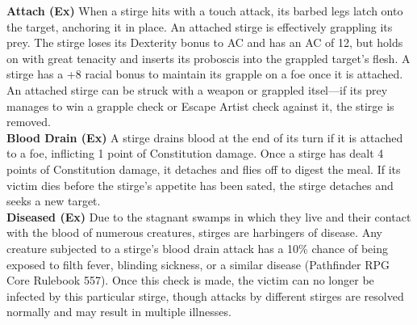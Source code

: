 \textbf{Attach (Ex)} When a stirge hits with a touch attack, its barbed legs latch onto the target, anchoring it in place. An attached stirge is effectively grappling its prey. The stirge loses its Dexterity bonus to AC and has an AC of 12, but holds on with great tenacity and inserts its proboscis into the grappled target’s flesh. A stirge has a +8 racial bonus to maintain its grapple on a foe once it is attached. An attached stirge can be struck with a weapon or grappled itsel---if its prey manages to win a grapple check or Escape Artist check against it, the stirge is removed. \\

\textbf{Blood Drain (Ex)} A stirge drains blood at the end of its turn if it is attached to a foe, inflicting 1 point of Constitution damage. Once a stirge has dealt 4 points of Constitution damage, it detaches and flies off to digest the meal. If its victim dies before the stirge’s appetite has been sated, the stirge detaches and seeks a new target. \\

\textbf{Diseased (Ex)} Due to the stagnant swamps in which they live and their contact with the blood of numerous creatures, stirges are harbingers of disease. Any creature subjected to a stirge’s blood drain attack has a 10\% chance of being exposed to filth fever, blinding sickness, or a similar disease (Pathfinder RPG Core Rulebook 557). Once this check is made, the victim can no longer be infected by this particular stirge, though attacks by different stirges are resolved normally and may result in multiple illnesses. \\


\newpage
